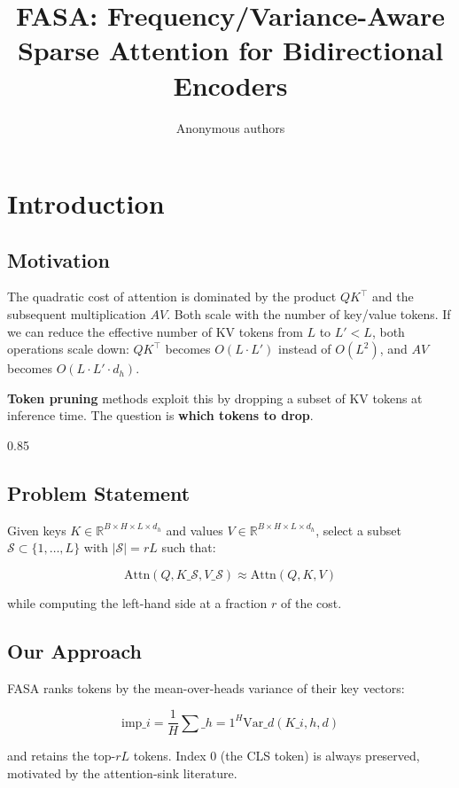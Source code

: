 \title{\textbf{FASA: Frequency/Variance-Aware Sparse Attention for Bidirectional Encoders}}

\author{Anonymous authors}



\section{Introduction}

\subsection{Motivation}

The quadratic cost of attention is dominated by the product $QK^\top$ and 
the subsequent multiplication $AV$. Both scale with the number of key/value 
tokens. If we can reduce the effective number of KV tokens from $L$ to 
$L' < L$, both operations scale down: $QK^\top$ becomes $O(L \cdot L')$ 
instead of $O(L^2)$, and $AV$ becomes $O(L \cdot L' \cdot d_h)$.

\textbf{Token pruning} methods exploit this by dropping a subset of KV tokens 
at inference time. The question is \textbf{which tokens to drop}.

0.85


\subsection{Problem Statement}

Given keys $K \in \mathbb{R}^{B \times H \times L \times d_h}$ and values 
$V \in \mathbb{R}^{B \times H \times L \times d_h}$, select a subset 
$\mathcal{S} \subset \{1, \ldots, L\}$ with $|\mathcal{S}| = r L$ such that:

\[
\text{Attn}(Q, K\_{\mathcal{S}}, V\_{\mathcal{S}}) \approx \text{Attn}(Q, K, V)
\tag{1.1}
\]

while computing the left-hand side at a fraction $r$ of the cost.

\subsection{Our Approach}

FASA ranks tokens by the mean-over-heads variance of their key vectors:

\[
\text{imp}\_i = \frac{1}{H} \sum\_{h=1}^{H} \text{Var}\_d(K\_{i,h,d})
\tag{1.2}
\]

and retains the top-$rL$ tokens. Index 0 (the CLS token) is always 
preserved, motivated by the attention-sink literature.

